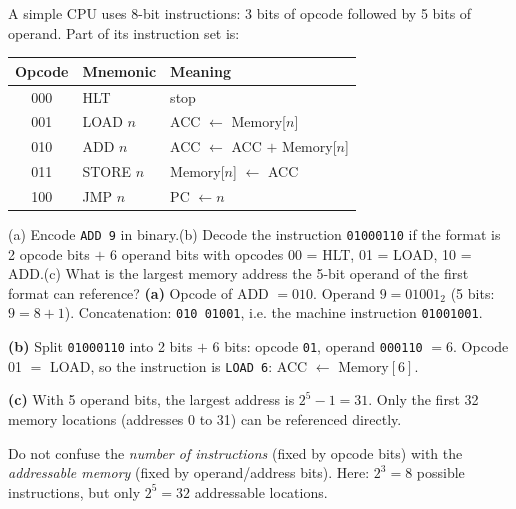 \documentclass[11pt]{article}
\newcounter{popsec}
\newcounter{popsub}
\newcommand{\courssub}[1]{%
  \stepcounter{popsub}%
  \par\vspace{9pt}\noindent{\popxbold\fontsize{11.5}{13}\selectfont\color{popink}{\color{poporange}\thepopsec.\thepopsub}\hspace{6pt}#1}\par\nopagebreak\vspace{4pt}
}
\begin{document}
\begin{exoresolu}
A simple CPU uses 8-bit instructions: 3 bits of opcode followed by 5 bits of operand. Part of its instruction set is:
\begin{center}
\begin{tabular}{|c|l|l|}
\hline
\rowcolor{popblueL} Opcode & Mnemonic & Meaning \\ \hline
000 & HLT & stop \\ \hline
001 & LOAD $n$ & ACC $\leftarrow$ Memory[$n$] \\ \hline
010 & ADD $n$ & ACC $\leftarrow$ ACC $+$ Memory[$n$] \\ \hline
011 & STORE $n$ & Memory[$n$] $\leftarrow$ ACC \\ \hline
100 & JMP $n$ & PC $\leftarrow n$ \\ \hline
\end{tabular}
\end{center}
(a) Encode \texttt{ADD 9} in binary.\quad (b) Decode the instruction \texttt{01000110} if the format is 2 opcode bits $+$ 6 operand bits with opcodes 00 = HLT, 01 = LOAD, 10 = ADD.\quad (c) What is the largest memory address the 5-bit operand of the first format can reference?
\tcblower
\textbf{(a)} Opcode of ADD $= 010$. Operand $9 = 01001_2$ (5 bits: $9 = 8+1$). Concatenation: \texttt{010 01001}, i.e. the machine instruction \texttt{01001001}.\par
\textbf{(b)} Split \texttt{01000110} into 2 bits $+$ 6 bits: opcode \texttt{01}, operand \texttt{000110} $= 6$. Opcode 01 $=$ LOAD, so the instruction is \texttt{LOAD 6}: ACC $\leftarrow$ Memory$[6]$.\par
\textbf{(c)} With 5 operand bits, the largest address is $2^5 - 1 = 31$. Only the first 32 memory locations (addresses 0 to 31) can be referenced directly.
\begin{attention}
Do not confuse the \emph{number of instructions} (fixed by opcode bits) with the \emph{addressable memory} (fixed by operand/address bits). Here: $2^3 = 8$ possible instructions, but only $2^5 = 32$ addressable locations.
\end{attention}
\end{exoresolu}

\courssub{Addressing Modes}
\end{document}
